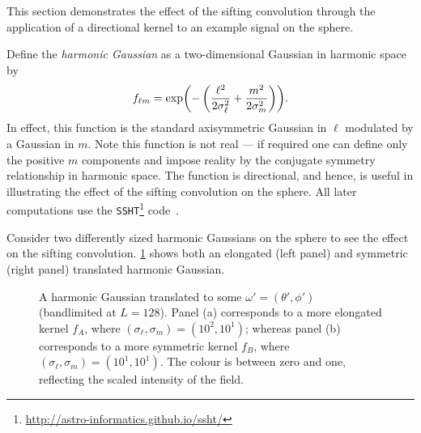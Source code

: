 This section demonstrates the effect of the sifting convolution through the application of a directional kernel to an example signal on the sphere.

Define the \emph{harmonic Gaussian} as a two-dimensional Gaussian in harmonic space by
%
\begin{equation}
	{f}_{\ell m} = \exp(-\left(\frac{{\ell}^{2}}{2\sigma_{\ell}^{2}} + \frac{{m}^{2}}{2\sigma_{m}^{2}}\right)).
\end{equation}
%
In effect, this function is the standard axisymmetric Gaussian in \(\ell{}\) modulated by a Gaussian in \(m\).
Note this function is not real --- if required one can define only the positive \(m\) components and impose reality by the conjugate symmetry relationship in harmonic space.
The function is directional, and hence, is useful in illustrating the effect of the sifting convolution on the sphere.
All later computations use the \texttt{SSHT}\footnote{\url{http://astro-informatics.github.io/ssht/}} code~\cite{McEwen2011}.

Consider two differently sized harmonic Gaussians on the sphere to see the effect on the sifting convolution.
\cref{fig:chapter2_translated} shows both an elongated (left panel) and symmetric (right panel) translated harmonic Gaussian.

\begin{figure}[htp]
	\centering
	\hfill
	\caption{
		A harmonic Gaussian translated to some \(\omega'=(\theta',\phi')\) (bandlimited at \(L=128\)).
		Panel (a) corresponds to a more elongated kernel \(f_{A}\), where \((\sigma_{\ell},\sigma_{m}) = (10^{2}, 10^{1})\); whereas panel (b) corresponds to a more symmetric kernel \(f_{B}\), where \((\sigma_{\ell},\sigma_{m}) = (10^{1}, 10^{1})\).
		The colour is between zero and one, reflecting the scaled intensity of the field.
	}\label{fig:chapter2_translated}
\end{figure}

